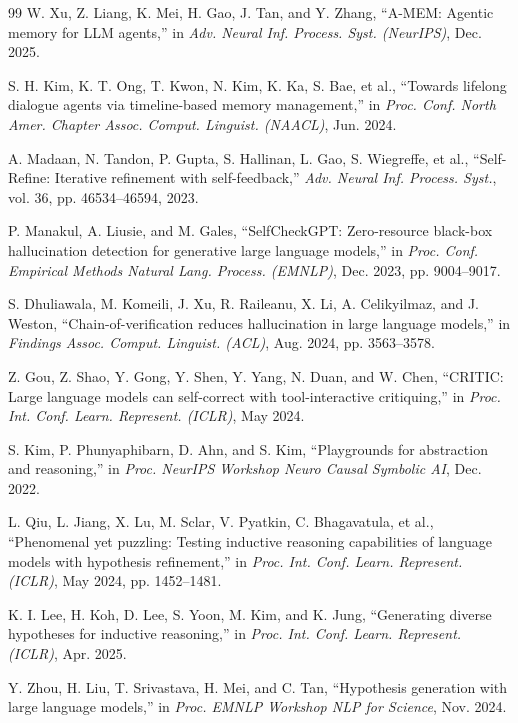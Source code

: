 \documentclass[11pt,letterpaper,onecolumn]{article}
\begin{document}
\begin{thebibliography}{99}
W. Xu, Z. Liang, K. Mei, H. Gao, J. Tan, and Y. Zhang, ``A-MEM: Agentic memory for LLM agents,'' in \emph{Adv. Neural Inf. Process. Syst. (NeurIPS)}, Dec. 2025.

S. H. Kim, K. T. Ong, T. Kwon, N. Kim, K. Ka, S. Bae, et al., ``Towards lifelong dialogue agents via timeline-based memory management,'' in \emph{Proc. Conf. North Amer. Chapter Assoc. Comput. Linguist. (NAACL)}, Jun. 2024.

A. Madaan, N. Tandon, P. Gupta, S. Hallinan, L. Gao, S. Wiegreffe, et al., ``Self-Refine: Iterative refinement with self-feedback,'' \emph{Adv. Neural Inf. Process. Syst.}, vol. 36, pp. 46534--46594, 2023.

P. Manakul, A. Liusie, and M. Gales, ``SelfCheckGPT: Zero-resource black-box hallucination detection for generative large language models,'' in \emph{Proc. Conf. Empirical Methods Natural Lang. Process. (EMNLP)}, Dec. 2023, pp. 9004--9017.

S. Dhuliawala, M. Komeili, J. Xu, R. Raileanu, X. Li, A. Celikyilmaz, and J. Weston, ``Chain-of-verification reduces hallucination in large language models,'' in \emph{Findings Assoc. Comput. Linguist. (ACL)}, Aug. 2024, pp. 3563--3578.

Z. Gou, Z. Shao, Y. Gong, Y. Shen, Y. Yang, N. Duan, and W. Chen, ``CRITIC: Large language models can self-correct with tool-interactive critiquing,'' in \emph{Proc. Int. Conf. Learn. Represent. (ICLR)}, May 2024.

S. Kim, P. Phunyaphibarn, D. Ahn, and S. Kim, ``Playgrounds for abstraction and reasoning,'' in \emph{Proc. NeurIPS Workshop Neuro Causal Symbolic AI}, Dec. 2022.

L. Qiu, L. Jiang, X. Lu, M. Sclar, V. Pyatkin, C. Bhagavatula, et al., ``Phenomenal yet puzzling: Testing inductive reasoning capabilities of language models with hypothesis refinement,'' in \emph{Proc. Int. Conf. Learn. Represent. (ICLR)}, May 2024, pp. 1452--1481.

K. I. Lee, H. Koh, D. Lee, S. Yoon, M. Kim, and K. Jung, ``Generating diverse hypotheses for inductive reasoning,'' in \emph{Proc. Int. Conf. Learn. Represent. (ICLR)}, Apr. 2025.

Y. Zhou, H. Liu, T. Srivastava, H. Mei, and C. Tan, ``Hypothesis generation with large language models,'' in \emph{Proc. EMNLP Workshop NLP for Science}, Nov. 2024.


\end{thebibliography}
\end{document}
